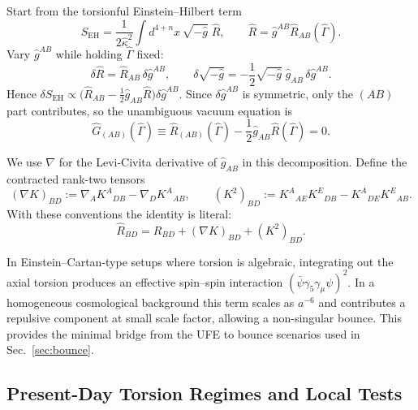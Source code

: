 \begin{tcolorbox}[colback=gray!5, colframe=gray!60,
title={\textbf{Why the UFE uses the symmetric torsionful Einstein tensor}}, fonttitle=\bfseries\small]
Start from the torsionful Einstein--Hilbert term
\[
S_{\mathrm{EH}}=\frac{1}{2\hat{\kappa}^2}\int d^{4+n}x\,\sqrt{-\hat{g}}\;\hat{R},
\qquad
\hat{R}=\hat{g}^{AB}\hat{R}_{AB}(\hat{\Gamma}).
\]
Vary $\hat{g}^{AB}$ while holding $\hat{\Gamma}$ fixed:
\[
\delta\hat{R}=\hat{R}_{AB}\,\delta\hat{g}^{AB},
\qquad
\delta\sqrt{-\hat{g}}=-\frac12\sqrt{-\hat{g}}\;\hat{g}_{AB}\,\delta\hat{g}^{AB}.
\]
Hence $\delta S_{\mathrm{EH}}\propto\bigl(\hat{R}_{AB}-\tfrac12\hat{g}_{AB}\hat{R}\bigr)\delta\hat{g}^{AB}$.
Since $\delta\hat{g}^{AB}$ is symmetric, only the $(AB)$ part contributes, so the unambiguous vacuum equation is
\[
\hat{G}_{(AB)}(\hat{\Gamma})\equiv \hat{R}_{(AB)}(\hat{\Gamma})-\frac12\hat{g}_{AB}\hat{R}(\hat{\Gamma})=0.
\]
\end{tcolorbox}

\begin{tcolorbox}[colback=gray!5, colframe=gray!60,
title={\textbf{Notation: Ricci tensor under }\(\hat{\Gamma}=\Gamma(\hat{g})+K\)}, fonttitle=\bfseries\small]
We use $\nabla$ for the Levi-Civita derivative of $\hat{g}_{AB}$ in this decomposition.
Define the contracted rank-two tensors
\[
(\nabla K)_{BD}:=\nabla_A K^A{}_{DB}-\nabla_D K^A{}_{AB},
\qquad
(K^2)_{BD}:=K^A{}_{AE}K^E{}_{DB}-K^A{}_{DE}K^E{}_{AB}.
\]
With these conventions the identity is literal:
\[
\hat{R}_{BD}=R_{BD}+(\nabla K)_{BD}+(K^2)_{BD}.
\]
\end{tcolorbox}

\begin{tcolorbox}[colback=blue!3, colframe=blue!40,
    title={\textbf{Lemma (Torsion-Induced Bounce Term)}}, fonttitle=\bfseries\small]
In Einstein--Cartan-type setups where torsion is algebraic, integrating out the
axial torsion produces an effective spin--spin interaction
$(\bar{\psi}\gamma_5\gamma_\mu\psi)^2$. In a homogeneous cosmological background this term
scales as $a^{-6}$ and contributes a repulsive component at small scale factor,
allowing a non-singular bounce. This provides the minimal bridge from the UFE to
bounce scenarios used in Sec.~\ref{sec:bounce}.
\end{tcolorbox}

\subsection{Present-Day Torsion Regimes and Local Tests}
\label{sec:torsion-regimes}

